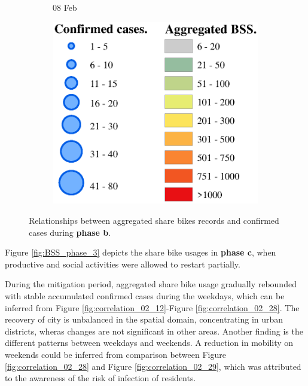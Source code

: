 \documentclass[preprints,article,accept,moreauthors,pdftex]{Definitions/mdpi}
\begin{document}
\begin{figure}[ht]
\begin{subfigure}{.3\textwidth}
        \caption{08 Feb}
    \end{subfigure}
    \begin{subfigure}{.3\textwidth}
        \includegraphics[width=\textwidth]{Figures/Relation_with_confrimed_cases/legend7.eps}
    \end{subfigure}
    \caption{Relationships between aggregated share bikes records and confirmed cases during \textbf{phase b}.}
    \label{fig:BSS_phase1_2}
\end{figure}

Figure \ref{fig:BSS_phase_3} depicts the share bike usages in \textbf{phase c}, when productive and social activities were allowed to restart partially.

During the mitigation period, aggregated share bike usage gradually rebounded with stable accumulated confirmed cases during the weekdays, which can be inferred from Figure \ref{fig:correlation_02_12}-Figure \ref{fig:correlation_02_28}.
The recovery of city is unbalanced in the spatial domain, concentrating in urban districts, wheras changes are not significant in other areas.
Another finding is the different patterns between weekdays and weekends.
A reduction in mobility on weekends could be inferred from comparison between Figure \ref{fig:correlation_02_28} and Figure \ref{fig:correlation_02_29}, which was attributed to the awareness of the risk of infection of residents.
\end{document}
